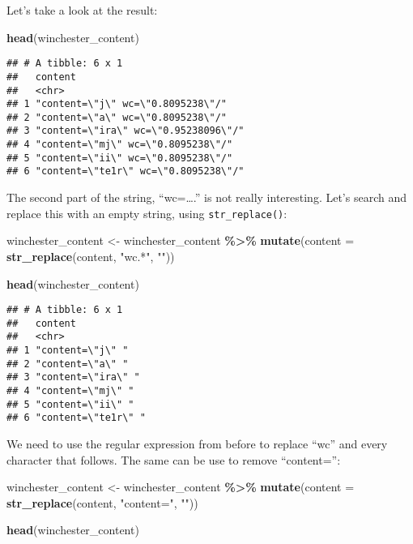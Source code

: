 \documentclass[
]{article}
\newenvironment{Shaded}{\begin{snugshade}}{\end{snugshade}}
\newcommand{\DataTypeTok}[1]{\textcolor[rgb]{0.13,0.29,0.53}{#1}}
\newcommand{\KeywordTok}[1]{\textcolor[rgb]{0.13,0.29,0.53}{\textbf{#1}}}
\newcommand{\NormalTok}[1]{#1}
\newcommand{\OperatorTok}[1]{\textcolor[rgb]{0.81,0.36,0.00}{\textbf{#1}}}
\newcommand{\StringTok}[1]{\textcolor[rgb]{0.31,0.60,0.02}{#1}}
\begin{document}
Let's take a look at the result:

\begin{Shaded}
\begin{Highlighting}[]
\KeywordTok{head}\NormalTok{(winchester\_content)}
\end{Highlighting}
\end{Shaded}

\begin{verbatim}
## # A tibble: 6 x 1
##   content                             
##   <chr>                               
## 1 "content=\"j\" wc=\"0.8095238\"/"   
## 2 "content=\"a\" wc=\"0.8095238\"/"   
## 3 "content=\"ira\" wc=\"0.95238096\"/"
## 4 "content=\"mj\" wc=\"0.8095238\"/"  
## 5 "content=\"ii\" wc=\"0.8095238\"/"  
## 6 "content=\"te1r\" wc=\"0.8095238\"/"
\end{verbatim}

The second part of the string, ``wc=\ldots.'' is not really interesting. Let's search and replace this
with an empty string, using \texttt{str\_replace()}:

\begin{Shaded}
\begin{Highlighting}[]
\NormalTok{winchester\_content \textless{}{-}}\StringTok{ }\NormalTok{winchester\_content }\OperatorTok{\%\textgreater{}\%}\StringTok{ }
\StringTok{  }\KeywordTok{mutate}\NormalTok{(}\DataTypeTok{content =} \KeywordTok{str\_replace}\NormalTok{(content, }\StringTok{"wc.*"}\NormalTok{, }\StringTok{""}\NormalTok{))}

\KeywordTok{head}\NormalTok{(winchester\_content)}
\end{Highlighting}
\end{Shaded}

\begin{verbatim}
## # A tibble: 6 x 1
##   content            
##   <chr>              
## 1 "content=\"j\" "   
## 2 "content=\"a\" "   
## 3 "content=\"ira\" " 
## 4 "content=\"mj\" "  
## 5 "content=\"ii\" "  
## 6 "content=\"te1r\" "
\end{verbatim}

We need to use the regular expression from before to replace ``wc'' and every character that follows.
The same can be use to remove ``content='':

\begin{Shaded}
\begin{Highlighting}[]
\NormalTok{winchester\_content \textless{}{-}}\StringTok{ }\NormalTok{winchester\_content }\OperatorTok{\%\textgreater{}\%}\StringTok{ }
\StringTok{  }\KeywordTok{mutate}\NormalTok{(}\DataTypeTok{content =} \KeywordTok{str\_replace}\NormalTok{(content, }\StringTok{"content="}\NormalTok{, }\StringTok{""}\NormalTok{))}

\KeywordTok{head}\NormalTok{(winchester\_content)}
\end{Highlighting}
\end{Shaded}
\end{document}

